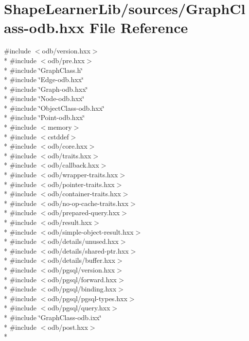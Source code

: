 \hypertarget{_graph_class-odb_8hxx}{}\section{Shape\+Learner\+Lib/sources/\+Graph\+Class-\/odb.hxx File Reference}
\label{_graph_class-odb_8hxx}
{\ttfamily \#include $<$odb/version.\+hxx$>$}\\*
{\ttfamily \#include $<$odb/pre.\+hxx$>$}\\*
{\ttfamily \#include \char`\"{}Graph\+Class.\+h\char`\"{}}\\*
{\ttfamily \#include \char`\"{}Edge-\/odb.\+hxx\char`\"{}}\\*
{\ttfamily \#include \char`\"{}Graph-\/odb.\+hxx\char`\"{}}\\*
{\ttfamily \#include \char`\"{}Node-\/odb.\+hxx\char`\"{}}\\*
{\ttfamily \#include \char`\"{}Object\+Class-\/odb.\+hxx\char`\"{}}\\*
{\ttfamily \#include \char`\"{}Point-\/odb.\+hxx\char`\"{}}\\*
{\ttfamily \#include $<$memory$>$}\\*
{\ttfamily \#include $<$cstddef$>$}\\*
{\ttfamily \#include $<$odb/core.\+hxx$>$}\\*
{\ttfamily \#include $<$odb/traits.\+hxx$>$}\\*
{\ttfamily \#include $<$odb/callback.\+hxx$>$}\\*
{\ttfamily \#include $<$odb/wrapper-\/traits.\+hxx$>$}\\*
{\ttfamily \#include $<$odb/pointer-\/traits.\+hxx$>$}\\*
{\ttfamily \#include $<$odb/container-\/traits.\+hxx$>$}\\*
{\ttfamily \#include $<$odb/no-\/op-\/cache-\/traits.\+hxx$>$}\\*
{\ttfamily \#include $<$odb/prepared-\/query.\+hxx$>$}\\*
{\ttfamily \#include $<$odb/result.\+hxx$>$}\\*
{\ttfamily \#include $<$odb/simple-\/object-\/result.\+hxx$>$}\\*
{\ttfamily \#include $<$odb/details/unused.\+hxx$>$}\\*
{\ttfamily \#include $<$odb/details/shared-\/ptr.\+hxx$>$}\\*
{\ttfamily \#include $<$odb/details/buffer.\+hxx$>$}\\*
{\ttfamily \#include $<$odb/pgsql/version.\+hxx$>$}\\*
{\ttfamily \#include $<$odb/pgsql/forward.\+hxx$>$}\\*
{\ttfamily \#include $<$odb/pgsql/binding.\+hxx$>$}\\*
{\ttfamily \#include $<$odb/pgsql/pgsql-\/types.\+hxx$>$}\\*
{\ttfamily \#include $<$odb/pgsql/query.\+hxx$>$}\\*
{\ttfamily \#include \char`\"{}Graph\+Class-\/odb.\+ixx\char`\"{}}\\*
{\ttfamily \#include $<$odb/post.\+hxx$>$}\\*
